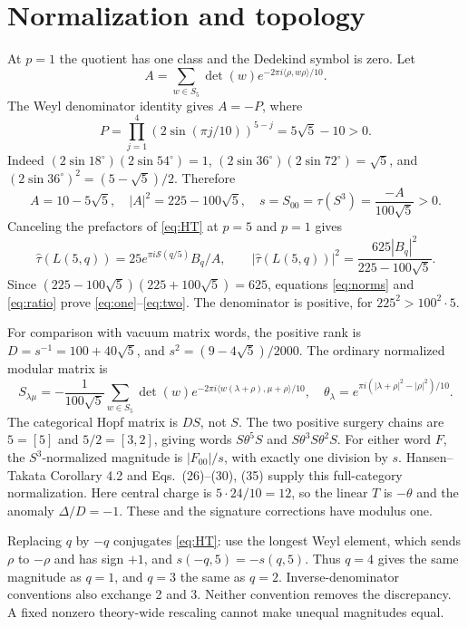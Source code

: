 \documentclass[11pt]{article}
\newcommand{\wt}{\widehat\tau}
\begin{document}
\section{Normalization and topology}
At $p=1$ the quotient has one class and the Dedekind symbol is zero.
Let
\[
A=\sum_{w\in S_5}\det(w)e^{-2\pi i\langle\rho,w\rho\rangle/10}.
\]
The Weyl denominator identity gives $A=-P$, where
\[
P=\prod_{j=1}^4(2\sin(\pi j/10))^{5-j}=5\sqrt5-10>0.
\]
Indeed $(2\sin18^\circ)(2\sin54^\circ)=1$,
$(2\sin36^\circ)(2\sin72^\circ)=\sqrt5$, and
$(2\sin36^\circ)^2=(5-\sqrt5)/2$. Therefore
\begin{equation}
 A=10-5\sqrt5,\quad |A|^2=225-100\sqrt5,\quad
 s=S_{00}=\tau(S^3)=\frac{-A}{100\sqrt5}>0.
\label{eq:A}
\end{equation}
Canceling the prefactors of \eqref{eq:HT} at $p=5$ and $p=1$ gives
\begin{equation}
 \wt(L(5,q))=25e^{\pi i\mathcal S(q/5)}B_q/A,
 \qquad |\wt(L(5,q))|^2=\frac{625|B_q|^2}{225-100\sqrt5}.
\label{eq:ratio}
\end{equation}
Since $(225-100\sqrt5)(225+100\sqrt5)=625$, equations
\eqref{eq:norms} and \eqref{eq:ratio} prove \eqref{eq:one}--\eqref{eq:two}.
The denominator is positive, for $225^2>100^2\cdot5$.

For comparison with vacuum matrix words, the positive rank is
$D=s^{-1}=100+40\sqrt5$, and $s^2=(9-4\sqrt5)/2000$.
The ordinary normalized modular matrix is
\[
 S_{\lambda\mu}=-\frac1{100\sqrt5}
 \sum_{w\in S_5}\det(w)e^{-2\pi i\langle w(\lambda+\rho),\mu+\rho\rangle/10},
\quad
\theta_\lambda=e^{\pi i(|\lambda+\rho|^2-|\rho|^2)/10}.
\]
The categorical Hopf matrix is $DS$, not $S$. The two positive surgery
chains are $5=[5]$ and $5/2=[3,2]$, giving words
$S\theta^5S$ and $S\theta^3S\theta^2S$. For either word $F$, the
$S^3$-normalized magnitude is $|F_{00}|/s$, with exactly one division
by $s$. Hansen--Takata Corollary 4.2 and Eqs.~(26)--(30), (35) supply
this full-category normalization. Here central charge is
$5\cdot24/10=12$, so the linear $T$ is $-\theta$ and the anomaly
$\Delta/D=-1$. These and the signature corrections have modulus one.

Replacing $q$ by $-q$ conjugates \eqref{eq:HT}: use the longest Weyl
element, which sends $\rho$ to $-\rho$ and has sign $+1$, and
$s(-q,5)=-s(q,5)$. Thus $q=4$ gives the same magnitude as $q=1$,
and $q=3$ the same as $q=2$. Inverse-denominator conventions also
exchange 2 and 3. Neither convention removes the discrepancy. A fixed
nonzero theory-wide rescaling cannot make unequal magnitudes equal.
\end{document}
